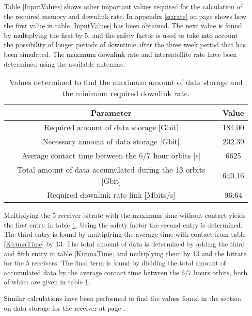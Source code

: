 Table \ref{InputValues} shows other important values required for the calculation of the required memory and downlink rate. In appendix \ref{scirate} on page \pageref{scirate} shows how the first value in table \ref{InputValues} has been obtained. The next value is found by multiplying the first by 5, and the safety factor is used to take into account the possibility of longer periods of downtime after the three week period that has been simulated. The maximum downlink rate and intersatellite rate have been determined using the available antennae.

\begin{table}[h]
\centering
\begin{tabular}{c|c}
\hline
\textbf{Parameter}  & \textbf{Value} \\\hline\hline
	Required amount of data storage [Gbit] & 184.00 \\
	Necessary amount of data storage [Gbit] & 202.39 \\
	Average contact time between the 6/7 hour orbits [s] & 6625 \\
	Total amount of data accumulated during the 13 orbits [Gbit] & 640.16 \\
	Required downlink rate link [Mbits/s] & 96.64 \\\hline
\end{tabular}
\caption{Values determined to find the maximum amount of data storage and the minimum required downlink rate.}
\label{ResultValues}
\end{table}

Multiplying the 5 receiver bitrate with the maximum time without contact yields the first entry in table \ref{ResultValues}. Using the safety factor the second entry is determined. The third entry is found by multiplying the average time with contact from table \ref{KirunaTime} by 13. The total amount of data is determined by adding the third and fifth entry in table \ref{KirunaTime} and multiplying them by 13 and the bitrate for the 5 receivers. The final term is found by dividing the total amount of accumulated data by the average contact time between the 6/7 hours orbits, both of which are given in table \ref{ResultValues}.

Similar calculations have been performed to find the values found in the section on data storage for the receiver at page \pageref{DSReceiver}.